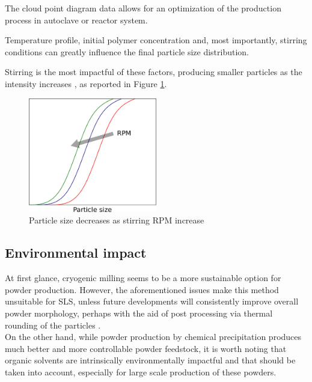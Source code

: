 \documentclass{article}
\begin{document}
    The cloud point diagram data allows for an optimization of the production process in autoclave or reactor system. 

    Temperature profile, initial polymer concentration and, most importantly, stirring conditions can greatly influence the final 
    particle size distribution. 
    
    Stirring is the most impactful of these factors, producing smaller particles as the intensity increases \autocites{DechetMaximilianA2020OtDo}, as reported in Figure \ref{fig:stirring_rpm}. 

    \begin{figure}[ht]
        \centering
        \includegraphics[width=0.5\textwidth]{Pictures/particle_size_stirring.eps}
        \caption{Particle size decreases as stirring RPM increase}
        \label{fig:stirring_rpm}
    \end{figure} 

    \clearpage

    \subsection{Environmental impact \label{Environmental_impact}}

    At first glance, cryogenic milling seems to be a more sustainable option for powder production. 
    However, the aforementioned issues make this method unsuitable for SLS, unless future developments will consistently improve 
    overall powder morphology, perhaps with the aid of 
    post processing via thermal rounding of the particles \autocite{DechetMaximilianA2020OtDo}. \\ 
    
    On the other hand, while powder production by 
    chemical precipitation produces much better and more 
    controllable powder feedstock, it is worth noting that organic solvents are intrinsically environmentally impactful and that should be taken 
    into account, especially for large scale production of these powders. 
\end{document}
